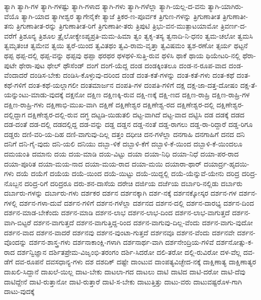 {ತ್ಯಾಗಿ
ತ್ಯಾಗಿ-ಗಳ
ತ್ಯಾಗಿ-ಗಳಷ್ಟು
ತ್ಯಾಗಿ-ಗಳಾದ
ತ್ಯಾಗಿ-ಗಳು
ತ್ಯಾಗಿ-ಗಳೆಲ್ಲಾ
ತ್ಯಾಗಿ-ಯಲ್ಲ-ದ-ವನು
ತ್ಯಾಗಿ-ಯಾಗಿರು-ವೆಯೊ
ತ್ಯಾಗಿ-ಯಾದ
ತ್ಯಾಗೀಶ್ವರ
ತ್ಯಾಗೇನೈಕೇ
ತ್ಯಾಜೆ
ತ್ರಿಕರ-ಣ-ಪೂರ್ವಕ
ತ್ರಿಗುಣ-ಗಳನ್ನು
ತ್ರಿಗುಣಾತೀತ
ತ್ರಿಗುಣಾತೀ-ತನು
ತ್ರಿಗುಣಾತೀತ-ರನ್ನು
ತ್ರಿಗುಣಾತೀತ-ರಿಗೆ
ತ್ರಿಗುಣಾತೀ-ತರು
ತ್ರಿಪುಟಿ
ತ್ರಿಭು-ವನ-ಮುತ್ಪಾಟಯಾಮೋ
ತ್ರಿವರ್ಣ-ದ-ವರೆಗೆ
ತ್ರಿಶೂನ್ಯ
ತ್ರಿಶೂಲ
ತ್ರೈಲೋಕ್ಯೇಽಪ್ಯಪ್ರತಿ-ಮಮ-ಹಿಮಾ
ತ್ವಂ
ತ್ವಕೃ-ತಸ್ಯ
ತ್ವನಾದಿ-ನಿ-ಧನಂ
ತ್ವಮ-ಚಲೋ
ತ್ವಮಸಿ
ತ್ವಮೃತಂಚ
ತ್ವಮೇವ
ತ್ವಯಿ
ತ್ವರೆ-ಯಿಂದ
ತ್ವವಿತಥಂ
ತ್ವವಿ-ರಾಮ-ವೃತ್ತಾ
ತ್ವವಿಷಮಂ
ತ್ವಶ-ರಣೋ
ತ್ಸರ್ಯ
ಥಟ್ಟನೆ
ಥಪ್ಪ
ಥಪ್ಪ-ದಲ್ಲಿ
ಥಪ್ಪ-ವನ್ನು
ಥಪ್ಪವು
ಥಪ್ಪಾ
ಥರಥರ
ಥಳಥಳಿ-ಸುತ್ತಿ-ರುವ
ಥಳಿಸಿ
ಥಾಕೆ
ಥಾಯ
ಥಿಯೇಟರಿ-ನಲ್ಲಿ
ಥೆರಾ-ಪುಟೇ
ಥೇರಾ-ಪುಟ
ಥೇಲ್
ಥೌಸೆಂಡ್
ದಂಗೆ
ದಂಗೆ-ಯೆದ್ದ
ದಂಡ
ದಂಡಕ್ಕಿಂತಲೂ
ದಂಡ-ನ-ರೂಪ-ವಾದ
ದಂಡ-ವೆಂದಾದರೆ
ದಂಡಿಸ-ಬೇಕು
ದಂಡಿಸಿ-ಕೊಳ್ಳುವು-ದರಿಂದ
ದಂಡೆ
ದಂತ-ಕತೆ-ಗಳನ್ನು
ದಂತ-ಕತೆ-ಗಳು
ದಂತ-ಕಥೆ
ದಂತ-ಕಥೆ-ಗಳಿಗೆ
ದಂತ-ಕಥೆ-ಯಲ್ಲಾಗಲೀ
ದಂತಮಾರ್ಜನ
ದಂಪತಿ-ಗಳ
ದಂಪತಿ-ಗಳಿಗೆ
ದಕ್ಷ
ದಕ್ಷ-ಜಾ-ದತ್ತ-ದೋಷಂ
ದಕ್ಷ-ತೆ-ಯನ್ನುಂಟು-ಮಾಡು-ವುದಕ್ಕೆ
ದಕ್ಷನೋ
ದಕ್ಷಿಣ
ದಕ್ಷಿಣಕ್ಕಿ-ರುವ
ದಕ್ಷಿ-ಣಕ್ಕೆ
ದಕ್ಷಿ-ಣದ
ದಕ್ಷಿಣ-ರಾಹ್ರಿ
ದಕ್ಷಿಣ-ರಾಹ್ರಿ-ಗಳ
ದಕ್ಷಿಣ-ರಾಹ್ರಿ-ಗಳು
ದಕ್ಷಿಣಾಭಿ-ಮುಖ-ವಾಗಿ
ದಕ್ಷಿಣೆ
ದಕ್ಷಿಣೇಶ್ವರ
ದಕ್ಷಿಣೇಶ್ವ-ರದ
ದಕ್ಷಿಣೇಶ್ವರ-ದಲ್ಲಿ
ದಕ್ಷಿಣೇಶ್ವರ-ದಲ್ಲಿದ್ದಾಗ
ದಕ್ಷಿಣೇಶ್ವರ-ದಲ್ಲಿ-ರುವ
ದಗ್ಧ
ದಟ್ಟಡಿ-ಯಿಡುತಲಿ
ದಟ್ಟ-ವಾಗಿದೆ
ದಟ್ಟ-ವಾದ
ದಟ್ಟಿಸಿ
ದಡ
ದಡಕ್ಕೆ
ದಡದ
ದಡ-ದಂತೆ
ದಡ-ದಲ್ಲಿ
ದಡದಲ್ಲಿದ್ದ
ದಡ-ವನ್ನು
ದಡ್ಡ
ದಡ್ಡನ
ದಡ್ಡ-ನಂತೆ
ದಡ್ಡ-ರಾಗಲು
ದಡ್ಡ-ರಾ-ರಿದ್ದಾರೆ
ದಡ್ಡ-ರಿಗೂ
ದಡ್ಡರು
ದಣಿ-ವರಿ-ಯ-ದಿಹ
ದಣಿ-ವಾಗುವು-ದಿಲ್ಲ
ದತ್ತಂ
ದಧೀಚಿ
ದನ-ಗಳೆಲ್ಲಾ
ದನಗಾಹಿ
ದನಗಾಹಿಗೆ
ದನದ
ದನಿ
ದನಿಗೆ
ದನಿ-ಗೈ-ವುದು
ದನಿ-ಯಲಿ
ದನಿಯು
ದಬ್ಬಾ-ಳಿಕೆ
ದಬ್ಬಾಳಿ-ಕೆಗೆ
ದಬ್ಬಾಳಿ-ಕೆ-ಯಿಂದ
ದಬ್ಬಾಳಿ-ಕೆ-ಯಿಂದಲೂ
ದಮಯಂತಿ
ದಮಾನು
ದಯ
ದಯ-ಮಾಡಿ
ದಯ-ವಿಟ್ಟು
ದಯಾ
ದಯಾ-ನಿಧಿ
ದಯಾ-ನಿಧೆ
ದಯಾ-ಪರ-ರಾದ
ದಯಾ-ಪೂರಿತ
ದಯಾ-ಮಯ-ನಾದ
ದಯಾ-ಮಯ-ರಾದ
ದಯಾ-ಮಯಿ
ದಯಾರಾ-ಥಾರ್
ದಯಾರ್ದ್ರ-ಹೃದಯಿ-ಗಳು
ದಯೆ
ದಯೆಗೆ
ದಯೆಯ
ದಯೆ-ಯಿಂದ
ದಯೆ-ಯಿಟ್ಟು
ದಯೆ-ಯಿದ್ದಲ್ಲಿ
ದಯೆ-ಯೆನ್ನುವೆ-ಯೇನು
ದರಿದ್ರ
ದರಿದ್ರ-ನೊಬ್ಬನ
ದರಿದ್ರ-ರಿಗೆ
ದರಿದ್ರರೂ
ದರು-ಶನ-ದಾಸೆಯ
ದರೇಚಿ
ದರ್ಜಿಯ
ದರ್ಜೆಯ
ದರ್ಬಾರಿ-ನಲ್ಲಿಡು
ದರ್ಬಾರು
ದರ್ಬಾರು-ಗಳನ್ನು
ದರ್ಬಾರು-ಗಳು
ದರ್ಶಕರ
ದರ್ಶನ
ದರ್ಶನಕ್ಕಾಗಿ
ದರ್ಶ-ನಕ್ಕೆ
ದರ್ಶನಕ್ಕೋಸ್ಕರ
ದರ್ಶನ-ಗಳ
ದರ್ಶನ-ಗಳಲ್ಲಿ
ದರ್ಶನ-ಗಳಾ-ದುವೆ
ದರ್ಶನ-ಗಳಿಗೆ
ದರ್ಶನ-ಗಳೆಲ್ಲಾ
ದರ್ಶನದ
ದರ್ಶನ-ದಲ್ಲಿ
ದರ್ಶನ-ದಾರಭ್ಯ
ದರ್ಶನ-ದಿಂದ
ದರ್ಶನ-ಮಾಡ-ಬೇಕೆಂದು
ದರ್ಶನ-ಮಾಡಿ
ದರ್ಶನ-ಲಾಭ
ದರ್ಶನ-ಲಾಭ-ದಿಂದ
ದರ್ಶನ-ಲಾಭ-ವಾಗುತ್ತದೆ
ದರ್ಶನ-ವಾಗಿ-ಬಿಟ್ಟರೆ
ದರ್ಶನ-ವಾಗುತ್ತದೆ
ದರ್ಶನ-ವಾಗುತ್ತಿದ್ದ-ರಿಂದ
ದರ್ಶನ-ವಾಗುವು-ದಿಲ್ಲ-ವೆಂದು
ದರ್ಶನ-ವಾಗು-ವುದೋ
ದರ್ಶನ-ವಾದ
ದರ್ಶನ-ವಾದರೆ
ದರ್ಶನವು
ದರ್ಶನ-ವುಂಟಾ-ಗುತ್ತದೆ
ದರ್ಶನವೂ
ದರ್ಶನ-ವೆಂದು
ದರ್ಶನವೇ
ದರ್ಶನ-ವೊಂದನ್ನು
ದರ್ಶನ-ಶಾಸ್ತ್ರ-ಗಳು
ದರ್ಶನಾಕಾಂಕ್ಷಿ-ಗಳಾಗಿ
ದರ್ಶನಾರ್ಥ-ವಾಗಿ
ದರ್ಶನೇಂದ್ರಿಯ-ಗಳಿವೆ
ದರ್ಶನೋತ್ಸು-ಕ-ರಾದ
ದರ್ಶನ್ವಿಜ್ಞಾನ
ದರ್ಶಿತಪ್ರೇಮ-ವಿಜೃಂಭಿ-ತರಂಗಂ
ದರ್ಶಿ-ಸಿದರೋ
ದಲಿ-ತರೋ
ದಲ್ಲಿ-ರುವಿರೋ
ದಳ-ವೆಲ್ಲ
ದವ-ಡೆಗೆ
ದವ-ರೂಪನೆ
ದವಸಧಾನ್ಯ-ಗಳು
ದಶ
ದಶದಿಕ್
ದಷ್ಟೇ
ದಾಂಟುವ
ದಾಂಪತ್ಯವಿಚ್ಛೇದ-ನಕ್ಕೆ
ದಾಕ್ಷಿಣಾತ್ಯ
ದಾಕ್ಷಿಣಾತ್ಯರ
ದಾಖಲಿ-ಸಿದ್ದಾನೆ
ದಾಖಲೆ-ಯಿಲ್ಲ
ದಾಟ-ಬೇಕು
ದಾಟಲಾ-ಗದ
ದಾಟಲು
ದಾಟಿ
ದಾಟಿದ
ದಾಟಿ-ದರೋ
ದಾಟಿ-ದೆವು
ದಾಟಿದ್ದೇನೆ
ದಾಟಿ-ರುತ್ತಾನೋ
ದಾಟಿ-ರುತ್ತಾರೆ
ದಾಟಿ-ಸ-ಬೇಕು
ದಾಟುತ್ತಿತ್ತು
ದಾಟು-ವರು
ದಾಟುವಷ್ಟರೊಳ-ಗಾಗಿ
ದಾಟು-ವುದಕ್ಕೆ
}

